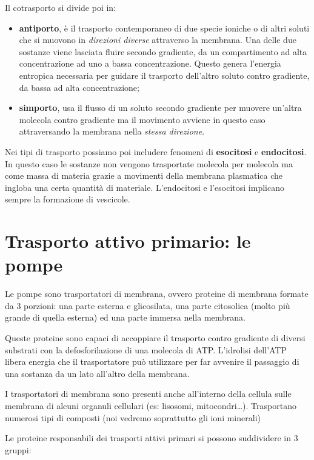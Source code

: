 \documentclass[]{article}
\begin{document}
Il cotrasporto si divide poi in:

\begin{itemize}
\itemsep1pt\parskip0pt
\item
  \textbf{antiporto}, è il trasporto contemporaneo di due specie ioniche
  o di altri soluti che si muovono in \emph{direzioni diverse}
  attraverso la membrana. Una delle due sostanze viene lasciata fluire
  secondo gradiente, da un compartimento ad alta concentrazione ad uno a
  bassa concentrazione. Questo genera l'energia entropica necessaria per
  guidare il trasporto dell'altro soluto contro gradiente, da bassa ad
  alta concentrazione;
\item
  \textbf{simporto}, usa il flusso di un soluto secondo gradiente per
  muovere un'altra molecola contro gradiente ma il movimento avviene in
  questo caso attraversando la membrana nella \emph{stessa direzione}.
\end{itemize}

Nei tipi di trasporto possiamo poi includere fenomeni di
\textbf{esocitosi} e \textbf{endocitosi}. In questo caso le sostanze non
vengono trasportate molecola per molecola ma come massa di materia
grazie a movimenti della membrana plasmatica che ingloba una certa
quantità di materiale. L'endocitosi e l'esocitosi implicano sempre la
formazione di vescicole.

\section{Trasporto attivo primario: le
pompe}\label{trasporto-attivo-primario-le-pompe}

Le pompe sono trasportatori di membrana, ovvero proteine di membrana
formate da 3 porzioni: una parte esterna e glicosilata, una parte
citosolica (molto più grande di quella esterna) ed una parte immersa
nella membrana.

Queste proteine sono capaci di accoppiare il trasporto contro gradiente
di diversi substrati con la defosforilazione di una molecola di ATP.
L'idrolisi dell'ATP libera energia che il trasportatore può utilizzare
per far avvenire il passaggio di una sostanza da un lato all'altro della
membrana.

I trasportatori di membrana sono presenti anche all'interno della
cellula sulle membrana di alcuni organuli cellulari (es: lisosomi,
mitocondri\ldots{}). Trasportano numerosi tipi di composti (noi vedremo
soprattutto gli ioni minerali)

Le proteine responsabili dei trasporti attivi primari si possono
suddividere in 3 gruppi:
\end{document}

